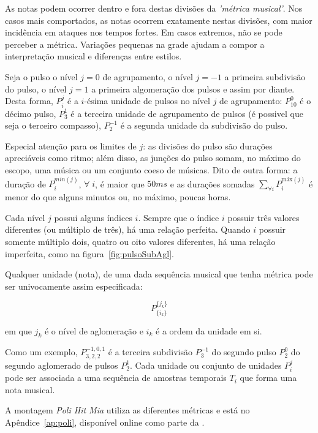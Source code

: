 As notas podem ocorrer dentro e fora destas divisões da \emph{'métrica musical'}. Nos casos mais comportados, as notas ocorrem exatamente nestas divisões, com maior incidência em ataques nos tempos fortes.
Em casos extremos, não se pode perceber a métrica.\cite{Roederer} Variações pequenas na grade ajudam a compor a interpretação musical e diferenças entre estilos.\cite{Cook}

Seja o pulso o nível $j=0$ de agrupamento, o nível $j=-1$ 
a primeira subdivisão do pulso, o nível $j=1$ a primeira algomeração dos pulsos e assim por diante. 
Desta forma, $P_i^j$ é a $i$-ésima unidade de 
pulsos no nível $j$ de agrupamento:
$P^0_{10}$ é o décimo pulso, $P^{1}_3$ é a terceira unidade de agrupamento de pulsos (é possivel que seja o terceiro compasso),
$P^{-1}_2$ é a segunda unidade da subdivisão do pulso.

Especial atenção para
os limites de $j$: as divisões do pulso são durações apreciáveis
como ritmo; além disso, as junções do pulso somam, no máximo
do escopo, uma música ou um conjunto coeso de músicas. Dito de outra forma: a duração de $P^{min(j)}_i$, $\forall \; i$,
é maior que $50ms$ e as durações somadas $\sum_{\forall i}P^{\text{máx}(j)}_i$
é menor do que alguns minutos ou, no máximo, poucas horas.


Cada nível $j$ possui alguns índices $i$. Sempre que o índice $i$ possuir três valores diferentes
(ou múltiplo de três), há uma relação perfeita. 
Quando $i$ possuir somente múltiplo dois, quatro ou oito valores diferentes, há uma relação imperfeita, como na figura~\ref{fig:pulsoSubAgl}.


Qualquer unidade (nota), de uma
dada sequência musical que tenha métrica pode ser
univocamente assim especificada:

\begin{equation}
P^{ \{ j_k \} }_{ \{ i_{k} \}}
\end{equation}

em que $j_k$ é o nível de aglomeração e $i_k$ é a ordem
da unidade em si.

Como um exemplo, $P^{-1,0,1}_{3,2,2}$  é a terceira subdivisão $P^{-1}_3$ do segundo
pulso $P^0_2$ do segundo aglomerado de pulsos $P^1_2$.
Cada unidade ou conjunto de unidades $P_i^j$ pode ser associada a uma sequência de amostras temporais $T_i$ que forma uma nota musical. 

A montagem \emph{Poli Hit Mia} utiliza as diferentes métricas e está no Apêndice~\ref{ap:poli}, disponível online como parte da \massa.

